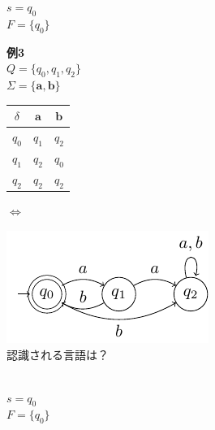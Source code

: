 \documentclass[main]{subfiles}
\begin{document}
\begin{tcolorbox}
$s = q_0$\\
$F = \{q_0\}$

\textbf{例3}\\
$Q = \{q_0, q_1, q_2\}$\\
$\Sigma = \{\mathbf{a,b}\}$\\[-14pt]
\begin{tabular}{c|cc}
$\delta$ & $\mathbf{a}$ & $\mathbf{b}$ \\
\hline
$q_0$ & $q_1$ & $q_2$ \\
$q_1$ & $q_2$ & $q_0$ \\
$q_2$ & $q_2$ & $q_2$ \\
\end{tabular}
\hspace{5mm} $\Leftrightarrow$ 
\begin{minipage}{0.45\textwidth}
  \includegraphics{figures/dfa3.pdf}\\[2mm]
  \small{認識される言語は？}
\end{minipage}\\[-20pt]

$s = q_0$\\
$F = \{q_0\}$
\end{tcolorbox}
\end{document}
